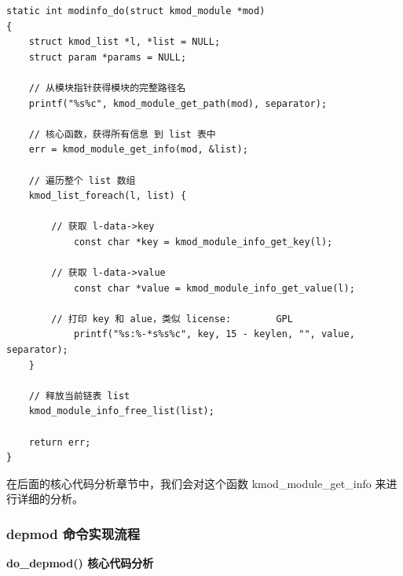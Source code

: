 \documentclass[11pt,a4paper]{article}
\begin{document}
{\begin{shaded}\begin{verbatim}
static int modinfo_do(struct kmod_module *mod)
{
    struct kmod_list *l, *list = NULL;
    struct param *params = NULL;

    // 从模块指针获得模块的完整路径名
    printf("%s%c", kmod_module_get_path(mod), separator);

    // 核心函数，获得所有信息 到 list 表中
    err = kmod_module_get_info(mod, &list);

    // 遍历整个 list 数组
    kmod_list_foreach(l, list) {

        // 获取 l-data->key 
            const char *key = kmod_module_info_get_key(l);

        // 获取 l-data->value
            const char *value = kmod_module_info_get_value(l);

        // 打印 key 和 alue，类似 license:        GPL
            printf("%s:%-*s%s%c", key, 15 - keylen, "", value, separator);
    }

    // 释放当前链表 list
    kmod_module_info_free_list(list);

    return err;
}
\end{verbatim}\end{shaded}}
在后面的核心代码分析章节中，我们会对这个函数 kmod\_module\_get\_info
来进行详细的分析。

\subsubsection{depmod 命令实现流程}

\textbf{do\_depmod() 核心代码分析}
\end{document}
